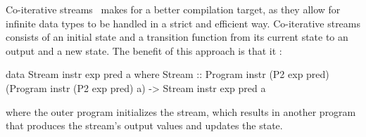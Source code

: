 \documentclass[../paper.tex]{subfiles}
\begin{document}
Co-iterative streams~\cite{caspi1998} makes for a better compilation target, as they allow for infinite data types to be handled in a strict and efficient way. Co-iterative streams consists of an initial state and a transition function from its current state to an output and a new state. The benefit of this approach is that it :

\begin{code}
data Stream instr exp pred a where
  Stream :: Program instr (P2 exp pred) (Program instr (P2 exp pred) a)
    -> Stream instr exp pred a
\end{code}

\noindent where the outer program initializes the stream, which results in another program that produces the stream's output values and updates the state.
\end{document}

